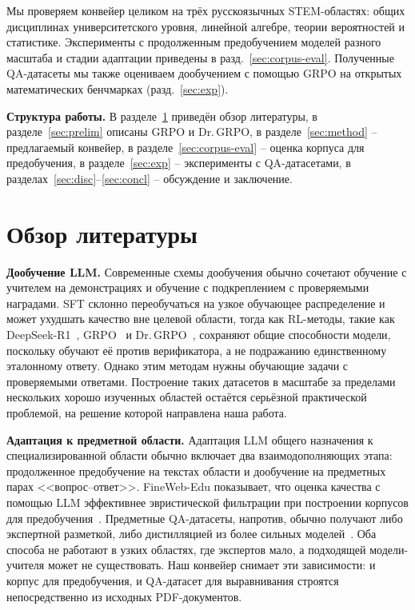 \documentclass{article}
\begin{document}
Мы проверяем конвейер целиком на трёх русскоязычных STEM-областях: общих дисциплинах университетского уровня, линейной алгебре, теории вероятностей и статистике. Эксперименты с продолженным предобучением моделей разного масштаба и стадии адаптации приведены в разд.~\ref{sec:corpus-eval}. Полученные QA-датасеты мы также оцениваем дообучением с помощью GRPO на открытых математических бенчмарках (разд.~\ref{sec:exp}).

\textbf{Структура работы.} В разделе~\ref{sec:rw} приведён обзор литературы, в разделе~\ref{sec:prelim} описаны GRPO и Dr.\,GRPO, в разделе~\ref{sec:method} -- предлагаемый конвейер, в разделе~\ref{sec:corpus-eval} -- оценка корпуса для предобучения, в разделе~\ref{sec:exp} -- эксперименты с QA-датасетами, в разделах~\ref{sec:disc}--\ref{sec:concl} -- обсуждение и заключение.

\section{Обзор литературы}\label{sec:rw}

\textbf{Дообучение LLM.}
Современные схемы дообучения обычно сочетают обучение с учителем на демонстрациях и обучение с подкреплением с проверяемыми наградами. SFT склонно переобучаться на узкое обучающее распределение и может ухудшать качество вне целевой области, тогда как RL-методы, такие как DeepSeek-R1~\cite{deepseek2025r1}, GRPO~\cite{shao2024deepseekmath} и Dr.\,GRPO~\cite{liu2025drgrpo}, сохраняют общие способности модели, поскольку обучают её против верификатора, а не подражанию единственному эталонному ответу. Однако этим методам нужны обучающие задачи с проверяемыми ответами. Построение таких датасетов в масштабе за пределами нескольких хорошо изученных областей остаётся серьёзной практической проблемой, на решение которой направлена наша работа.

\textbf{Адаптация к предметной области.}
Адаптация LLM общего назначения к специализированной области обычно включает два взаимодополняющих этапа: продолженное предобучение на текстах области и дообучение на предметных парах <<вопрос--ответ>>. FineWeb-Edu показывает, что оценка качества с помощью LLM эффективнее эвристической фильтрации при построении корпусов для предобучения~\cite{penedo2024fineweb}. Предметные QA-датасеты, напротив, обычно получают либо экспертной разметкой, либо дистилляцией из более сильных моделей~\cite{wang2022selfinstruct,xu2023wizardlm,luo2023wizardmath}. Оба способа не работают в узких областях, где экспертов мало, а подходящей модели-учителя может не существовать. Наш конвейер снимает эти зависимости: и корпус для предобучения, и QA-датасет для выравнивания строятся непосредственно из исходных PDF-документов.
\end{document}
